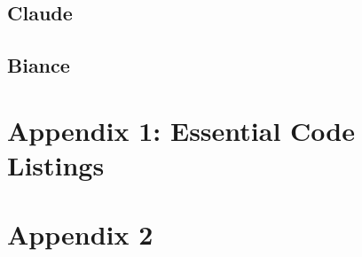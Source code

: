 \documentclass[onecolumn, draftclsnofoot,10pt, compsoc]{IEEEtran}
\begin{document}
	\subsection{Claude}
	
	\subsection{Biance}
	
	
	\section{Appendix 1: Essential Code Listings}
	\section{Appendix 2}
	
	\newpage
	
	
	
	
	
\end{document}
